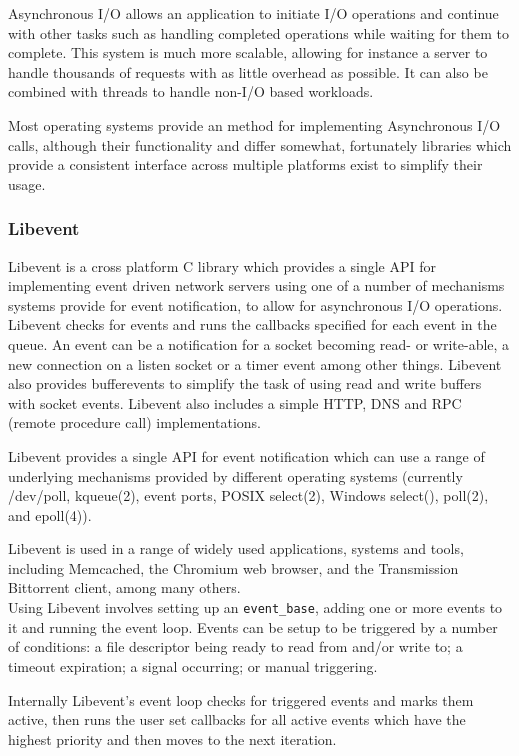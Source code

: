 \documentclass{article}
\begin{document}
Asynchronous I/O allows an application to initiate I/O operations and continue with other tasks such as handling completed operations while waiting for them to complete. This system is much more scalable, allowing for instance a server to handle thousands of requests with as little overhead as possible. It can also be combined with threads to handle non-I/O based workloads.

Most operating systems provide an method for implementing Asynchronous I/O calls, although their functionality and differ somewhat, fortunately libraries which provide a consistent interface across multiple platforms exist to simplify their usage.


\subsubsection{Libevent}
Libevent\cite{libevent} is a cross platform C library which provides a single API for implementing event driven network servers using one of a number of mechanisms systems provide for event notification, to allow for asynchronous I/O operations. Libevent checks for events and runs the callbacks specified for each event in the queue. An event can be a notification for a socket becoming read- or write-able, a new connection on a listen socket or a timer event among other things. Libevent also provides bufferevents to simplify the task of using read and write buffers with socket events. Libevent also includes a simple HTTP, DNS and RPC (remote procedure call) implementations.

Libevent provides a single API for event notification which can use a range of underlying mechanisms provided by different operating systems (currently /dev/poll, kqueue(2), event ports, POSIX select(2), Windows select(), poll(2), and epoll(4)).

Libevent is used in a range of widely used applications, systems and tools, including Memcached, the Chromium web browser, and the Transmission Bittorrent client, among many others.
\\
Using Libevent involves setting up an \texttt{event\_base}, adding one or more events to it and running the event loop. Events can be setup to be triggered by a number of conditions: a file descriptor being ready to read from and/or write to; a timeout expiration; a signal occurring; or manual triggering.

Internally Libevent's event loop checks for triggered events and marks them active, then runs the user set callbacks for all active events which have the highest priority and then moves to the next iteration.
\end{document}
